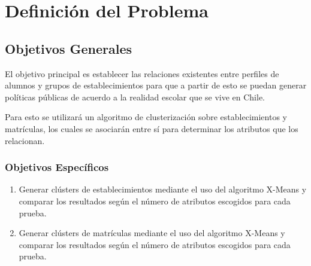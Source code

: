 \chapter{Definici\'on del Problema}
\section{Objetivos Generales}

El objetivo principal es establecer las relaciones existentes entre perfiles de alumnos y grupos de establecimientos para que a partir de esto se puedan generar políticas públicas de acuerdo a la realidad escolar que se vive en Chile.

Para esto se utilizará un algoritmo de clusterización sobre establecimientos y matrículas, los cuales se asociarán entre sí para determinar los atributos que los relacionan.

\subsection{Objetivos Específicos}
\begin{enumerate}
\item Generar clústers de establecimientos mediante el uso del algoritmo X-Means y comparar los resultados según el número de atributos escogidos para cada prueba.
\item Generar clústers de matrículas mediante el uso del algoritmo X-Means y comparar los resultados según el número de atributos escogidos para cada prueba.
\end{enumerate}